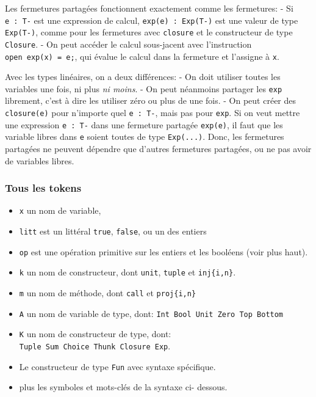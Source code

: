 \documentclass[12pt]{article}
\begin{document}
Les fermetures partagées fonctionnent exactement comme les fermetures: -
Si \texttt{e\ :\ T-} est une expression de calcul,
\texttt{exp(e)\ :\ Exp(T-)} est une valeur de type \texttt{Exp(T-)},
comme pour les fermetures avec \texttt{closure} et le constructeur de
type \texttt{Closure}. - On peut accéder le calcul sous-jacent avec
l'instruction \texttt{open\ exp(x)\ =\ e;}, qui évalue le calcul dans la
fermeture et l'assigne à \texttt{x}.

Avec les types linéaires, on a deux différences: - On doit utiliser
toutes les variables une fois, ni plus \emph{ni moins}. - On peut
néanmoins partager les \texttt{exp} librement, c'est à dire les utiliser
zéro ou plus de une fois. - On peut créer des \texttt{closure(e)} pour
n'importe quel \texttt{e\ :\ T-}, mais pas pour \texttt{exp}. Si on veut
mettre une expression \texttt{e\ :\ T-} dans une fermeture partagée
\texttt{exp(e)}, il faut que les variable libres dans \texttt{e} soient
toutes de type \texttt{Exp(...)}. Donc, les fermetures partagées ne
peuvent dépendre que d'autres fermetures partagées, ou ne pas avoir de
variables libres.

\pagebreak

\hypertarget{tous-les-tokens}{%
      \subsubsection*{Tous les tokens}\label{tous-les-tokens}}

\begin{itemize}
      \tightlist
      \item
            \texttt{x} un nom de variable,
      \item
            \texttt{litt} est un littéral \texttt{true}, \texttt{false}, ou un des
            entiers
      \item
            \texttt{op} est une opération primitive sur les entiers et les
            booléens (voir plus haut).
      \item
            \texttt{k} un nom de constructeur, dont \texttt{unit}, \texttt{tuple}
            et \texttt{inj\{i,n\}}.
      \item
            \texttt{m} un nom de méthode, dont \texttt{call} et
            \texttt{proj\{i,n\}}
      \item
            \texttt{A} un nom de variable de type, dont:
            \texttt{Int\ Bool\ Unit\ Zero\ Top\ Bottom}
      \item
            \texttt{K} un nom de constructeur de type, dont:
            \texttt{Tuple\ Sum\ Choice\ Thunk\ Closure\ Exp}.
      \item
            Le constructeur de type \texttt{Fun} avec syntaxe spécifique.
      \item
            plus les symboles et mots-clés de la syntaxe ci- dessous.
\end{itemize}
\end{document}
